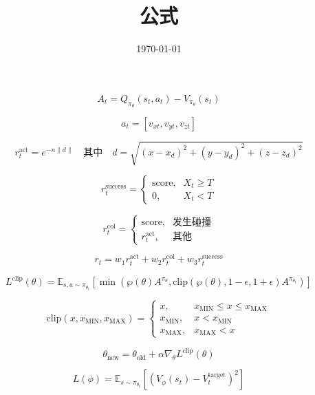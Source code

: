 \documentclass{article} %
\title{公式}  %
\date{\today}       %
\begin{document}
	\maketitle          
\begin{equation}
	A_t = Q_{\pi_\theta}(s_t, a_t) - V_{\pi_\theta}(s_t)
\end{equation}

\begin{equation}
	a_t = [v_{xt}, v_{yt}, v_{zt}]
\end{equation}

\begin{equation}
	r^{\text{act}}_t = e^{-n\|d\|} \quad \text{其中} \quad d = \sqrt{(x - x_d)^2 + (y - y_d)^2 + (z - z_d)^2}
\end{equation}

\begin{equation}
	r^{\text{success}}_t = 
	\begin{cases} 
		\text{score}, & X_t \geq T \\
		0, & X_t < T 
	\end{cases}
\end{equation}

\begin{equation}
	r^{\text{col}}_t = 
	\begin{cases} 
		\text{score}, & \text{发生碰撞} \\
		r^{\text{act}}_t, & \text{其他}
	\end{cases}
\end{equation}

\begin{equation}
	r_t = w_1 r^{\text{act}}_t + w_2 r^{\text{col}}_t + w_3 r^{\text{success}}_t
\end{equation}

\begin{equation}
	L^{\text{clip}}(\theta) = \mathbb{E}_{s,a \sim \pi_{\theta_t}} \left[ \min \left( \wp(\theta) A^{\pi_{\theta}}, \text{clip}(\wp(\theta), 1 - \epsilon, 1 + \epsilon) A^{\pi_{\theta_t}} \right) \right]
\end{equation}

\begin{equation}
	\text{clip}(x, x_{\text{MIN}}, x_{\text{MAX}}) = 
\begin{cases} 
	x, & x_{\text{MIN}} \leq x \leq x_{\text{MAX}} \\
	x_{\text{MIN}}, & x < x_{\text{MIN}} \\
	x_{\text{MAX}}, & x_{\text{MAX}} < x 
\end{cases}
\end{equation}

\begin{equation}
\theta_{\text{new}} = \theta_{\text{old}} + \alpha \nabla_\theta L^{\text{clip}}(\theta)
\end{equation}

\begin{equation}
L(\phi) = \mathbb{E}_{s \sim \pi_{\theta_t}} \left[ \left( V_\phi(s_t) - V_t^{\text{target}} \right)^2 \right]
\end{equation}
	
\end{document}
